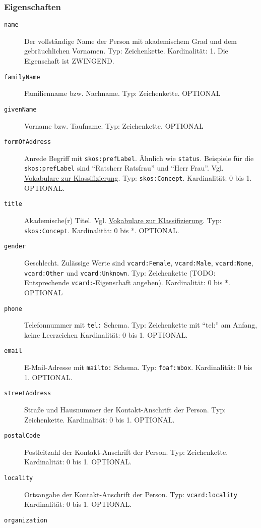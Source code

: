 \documentclass[,a4paper]{article}
\begin{document}
\subsubsection{Eigenschaften}\label{eigenschaften-3}

\begin{description}
\item[\texttt{name}]
Der vollständige Name der Person mit akademischem Grad und dem
gebräuchlichen Vornamen. Typ: Zeichenkette. Kardinalität: 1. Die
Eigenschaft ist ZWINGEND.
\item[\texttt{familyName}]
Familienname bzw. Nachname. Typ: Zeichenkette. OPTIONAL
\item[\texttt{givenName}]
Vorname bzw. Taufname. Typ: Zeichenkette. OPTIONAL
\item[\texttt{formOfAddress}]
Anrede Begriff mit \texttt{skos:prefLabel}. Ähnlich wie \texttt{status}.
Beispiele für die \texttt{skos:prefLabel} sind ``Ratsherr \textbar{}
Ratsfrau'' und ``Herr \textbar{} Frau''. Vgl.
\hyperref[vokabulareux5fklassifizierung]{Vokabulare zur
Klassifizierung}. Typ: \texttt{skos:Concept}. Kardinalität: 0 bis 1.
OPTIONAL.
\item[\texttt{title}]
Akademische(r) Titel. Vgl.
\hyperref[vokabulareux5fklassifizierung]{Vokabulare zur
Klassifizierung}. Typ: \texttt{skos:Concept}. Kardinalität: 0 bis *.
OPTIONAL.
\item[\texttt{gender}]
Geschlecht. Zulässige Werte sind \texttt{vcard:Female},
\texttt{vcard:Male}, \texttt{vcard:None}, \texttt{vcard:Other} und
\texttt{vcard:Unknown}. Typ: Zeichenkette (TODO: Entsprechende
\texttt{vcard:}-Eigenschaft angeben). Kardinalität: 0 bis *. OPTIONAL
\item[\texttt{phone}]
Telefonnummer mit \texttt{tel:} Schema. Typ: Zeichenkette mit ``tel:''
am Anfang, keine Leerzeichen Kardinalität: 0 bis 1. OPTIONAL.
\item[\texttt{email}]
E-Mail-Adresse mit \texttt{mailto:} Schema. Typ: \texttt{foaf:mbox}.
Kardinalität: 0 bis 1. OPTIONAL.
\item[\texttt{streetAddress}]
Straße und Hausnummer der Kontakt-Anschrift der Person. Typ:
Zeichenkette. Kardinalität: 0 bis 1. OPTIONAL.
\item[\texttt{postalCode}]
Postleitzahl der Kontakt-Anschrift der Person. Typ: Zeichenkette.
Kardinalität: 0 bis 1. OPTIONAL.
\item[\texttt{locality}]
Ortsangabe der Kontakt-Anschrift der Person. Typ:
\texttt{vcard:locality} Kardinalität: 0 bis 1. OPTIONAL.
\item[\texttt{organization}]

\end{description}
\end{document}
